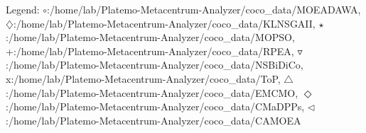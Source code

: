 Legend: {\color{CornflowerBlue}$\circ$}:/home/lab/Platemo-Metacentrum-Analyzer/coco\_data/MOEADAWA, {{}$\diamondsuit$}:/home/lab/Platemo-Metacentrum-Analyzer/coco\_data/KLNSGAII, {\color{Green}$\star$}:/home/lab/Platemo-Metacentrum-Analyzer/coco\_data/MOPSO, {\color{red}+}:/home/lab/Platemo-Metacentrum-Analyzer/coco\_data/RPEA, {\color{brown}$\triangledown$}:/home/lab/Platemo-Metacentrum-Analyzer/coco\_data/NSBiDiCo, {{}x}:/home/lab/Platemo-Metacentrum-Analyzer/coco\_data/ToP, {{}$\triangle$}:/home/lab/Platemo-Metacentrum-Analyzer/coco\_data/EMCMO, {{}$\Diamond$}:/home/lab/Platemo-Metacentrum-Analyzer/coco\_data/CMaDPPs, {{}$\triangleleft$}:/home/lab/Platemo-Metacentrum-Analyzer/coco\_data/CAMOEA